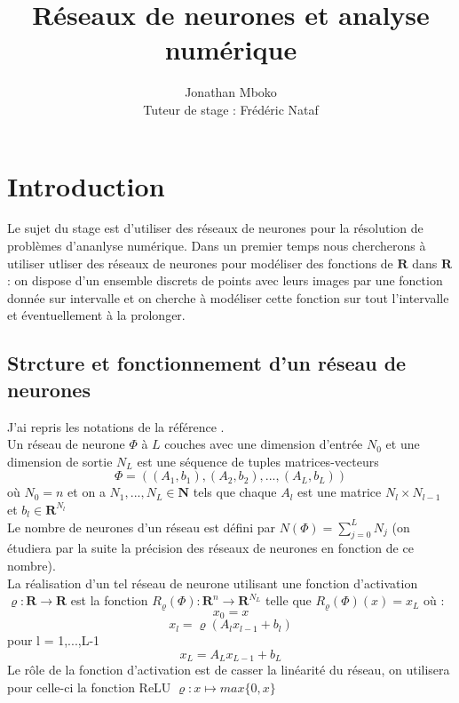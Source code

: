 \documentclass[a4paper,11pt,twoside]{report}
\author{Jonathan Mboko\\Tuteur de stage : Frédéric Nataf}
\title{Réseaux de neurones et analyse numérique}
\begin{document}
	
	\maketitle 
	
	\tableofcontents
	\chapter{Introduction}
	Le sujet du stage est d'utiliser des réseaux de neurones pour la résolution de problèmes d'ananlyse numérique. Dans un premier temps nous chercherons à utiliser utliser des réseaux de neurones pour modéliser des fonctions de $\mathbf{R}$ dans $\mathbf{R}$ : on dispose d'un ensemble discrets de points avec leurs images par une fonction donnée sur intervalle et on cherche à modéliser cette fonction sur tout l'intervalle et éventuellement à la prolonger.
	\section{Strcture et fonctionnement d'un réseau de neurones}
	J'ai repris les notations de la référence \cite{Kutyniok}.\\
	Un réseau de neurone $\Phi$ à $L$ couches avec une dimension d'entrée $N_0$ et une dimension de sortie $N_L$ est une séquence de tuples matrices-vecteurs $$\Phi = ((A_1,b_1),(A_2,b_2),...,(A_L,b_L)) $$ où $N_0 = n$ et on a $N_1,...,N_L \in \mathbf{N}$ tels que chaque $A_l$ est une matrice $N_l\times N_{l-1}$ et $b_l\in \mathbf{R}^{N_l}$\\
	Le nombre de neurones d'un réseau est défini par $N(\Phi) = \sum_{j=0}^{L}N_j$ (on étudiera par la suite la précision des réseaux de neurones en fonction de ce nombre).\\
	
	La réalisation d'un tel réseau de neurone utilisant une fonction d'activation $\varrho:\mathbf{R}\rightarrow\mathbf{R}$ est la fonction $R_\varrho(\Phi):\mathbf{R}^n\rightarrow\mathbf{R}^{N_L}$ telle que $R_\varrho(\Phi)(x)=x_L$ où :$$x_0 = x$$ $$x_l = \varrho(A_lx_{l-1}+b_l) $$pour l = 1,...,L-1$$x_L = A_Lx_{L-1}+b_L$$
	Le rôle de la fonction d'activation est de casser la linéarité du réseau, on utilisera pour celle-ci la fonction ReLU $\varrho:x\mapsto max\{0,x\}$\\
	
\end{document}
